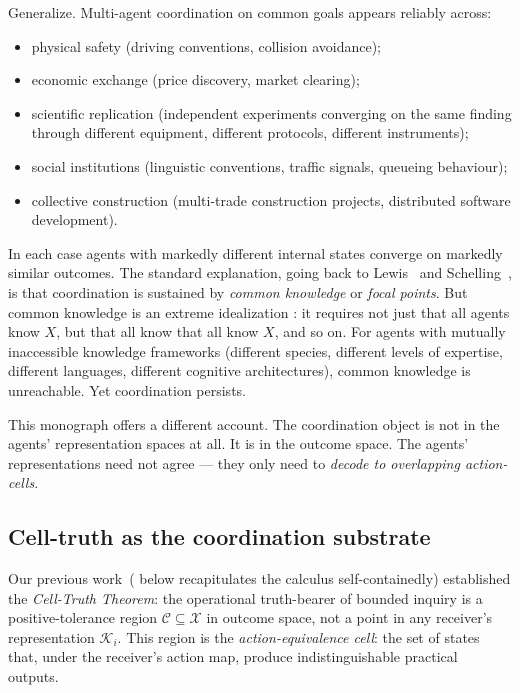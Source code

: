 \documentclass[11pt,a4paper]{article}
\newcommand{\K}{\mathcal{K}}
\newcommand{\X}{\mathcal{X}}
\newcommand{\Cell}{\mathcal{C}}
\begin{document}
Generalize. Multi-agent coordination on common goals appears reliably
across:
\begin{itemize}[leftmargin=*]
\item physical safety (driving conventions, collision avoidance);
\item economic exchange (price discovery, market clearing);
\item scientific replication (independent experiments converging on the
same finding through different equipment, different protocols, different
instruments);
\item social institutions (linguistic conventions, traffic signals,
queueing behaviour);
\item collective construction (multi-trade construction projects,
distributed software development).
\end{itemize}
In each case agents with markedly different internal states converge on
markedly similar outcomes. The standard explanation, going back to
Lewis~\cite{lewis1969} and Schelling~\cite{schelling1960}, is that
coordination is sustained by \emph{common knowledge} or \emph{focal
points}. But common knowledge is an extreme idealization
\cite{aumann1976,fagin1995}: it requires not just that all agents know
$X$, but that all know that all know $X$, and so on. For agents with
mutually inaccessible knowledge frameworks (different species, different
levels of expertise, different languages, different cognitive
architectures), common knowledge is unreachable. Yet coordination
persists.

This monograph offers a different account. The coordination object is
not in the agents' representation spaces at all. It is in the outcome
space. The agents' representations need not agree --- they only need to
\emph{decode to overlapping action-cells}.

\subsection{Cell-truth as the coordination substrate}

Our previous work~( below recapitulates the
calculus self-containedly) established the \emph{Cell-Truth Theorem}:
the operational truth-bearer of bounded inquiry is a positive-tolerance
region $\Cell\subseteq\X$ in outcome space, not a point in any receiver's
representation $\K_i$. This region is the
\emph{action-equivalence cell}: the set of states that, under the
receiver's action map, produce indistinguishable practical outputs.
\end{document}
